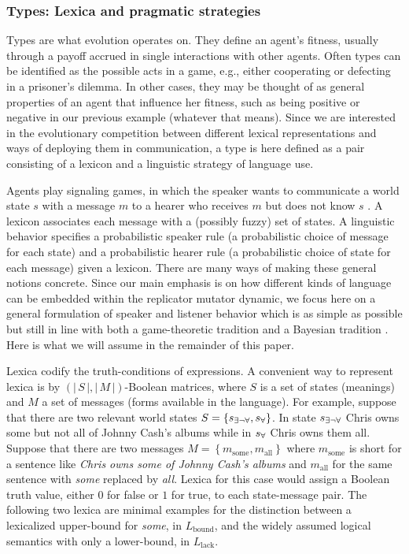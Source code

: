 \documentclass[a4paper, 11pt]{article}
\theoremstyle{Satz}
\newcommand{\set}[1]{\left\{#1\right\}}
\newcommand{\card}[1]{\left \lvert \, #1 \, \right\rvert}
\newcommand{\States}{\ensuremath{S}\xspace}		%
\newcommand{\state}{\ensuremath{s}\xspace}		%
\newcommand{\mystate}[1]{\ensuremath{\state_{\text{#1}}}\xspace} %
\newcommand{\mylang}[1]{\ensuremath{L_{\text{#1}}}\xspace} %
\newcommand{\Messgs}{\ensuremath{M}\xspace}		%
\newcommand{\messg}{\ensuremath{m}\xspace}		%
\newcommand{\mymessg}[1]{\ensuremath{\messg_{\text{#1}}}\xspace} %
\newcommand{\ssome}{\mystate{\ensuremath{\exists\neg\forall}}}
\newcommand{\sall}{\mystate{\ensuremath{\forall}}}
\newcommand{\msome}{\mymessg{some}}
\newcommand{\mall}{\mymessg{all}}
\newcommand{\Lbound}{\mylang{bound}}
\newcommand{\Llack}{\mylang{lack}}
\begin{document}
\subsubsection{Types: Lexica and pragmatic strategies}
\label{sec:languages+use}
Types are what evolution operates on. They define an agent's fitness, usually through a payoff
accrued in single interactions with other agents. Often types can be identified as the possible
acts in a game, e.g., either cooperating or defecting in a prisoner's dilemma. In other cases,
they may be thought of as general properties of an agent that influence her fitness, such as
being positive or negative in our previous example (whatever that means). Since we are
interested in the evolutionary competition between different lexical representations and ways
of deploying them in communication, a type is here defined as a pair consisting of a lexicon
and a linguistic strategy of language use.

Agents play signaling games, in which the speaker wants to communicate a world state $s$ with a
message $m$ to a hearer who receives $m$ but does not know $s$
\citep[e.g.][]{lewis:1969,Skyrms2010:Signals}. A lexicon associates each message with a
(possibly fuzzy) set of states. A linguistic behavior specifies a probabilistic speaker rule (a
probabilistic choice of message for each state) and a probabilistic hearer rule (a
probabilistic choice of state for each message) given a lexicon. There are many ways of making
these general notions concrete. Since our main emphasis is on how different kinds of language
can be embedded within the replicator mutator dynamic, we focus here on a general formulation
of speaker and listener behavior which is as simple as possible but still in line with both a
game-theoretic tradition
\citep[e.g.,][]{benz:2006,benz+vRooij:2007,jaeger:2007b,franke+jaeger:2014} and a Bayesian
tradition
\citep[e.g.,][]{frank+goodman:2012,goodman+stuhlmueller:2013,GoodmanFrank2016:Pragmatic-Langu}. Here
is what we will assume in the remainder of this paper.

Lexica codify the truth-conditions of expressions. A convenient way to represent lexica is by
$(\card{\States}, \card{\Messgs})$-Boolean matrices, where $\States$ is a set of states
(meanings) and $M$ a set of messages (forms available in the language). For example, suppose
that there are two relevant world states $\States = \set{\ssome, \sall}$. In state $\ssome$
Chris owns some but not all of Johnny Cash's albums while in $\sall$ Chris owns them
all. Suppose that there are two messages $\Messgs = \set{\msome, \mall}$ where $\msome$ is
short for a sentence like \emph{Chris owns some of Johnny Cash's albums} and $\mall$ for the
same sentence with \emph{some} replaced by \emph{all}.  Lexica for this case would assign a
Boolean truth value, either $0$ for false or $1$ for true, to each state-message pair. The
following two lexica are minimal examples for the distinction between a lexicalized upper-bound
for \emph{some}, in $\Lbound$, and the widely assumed logical semantics with only a lower-bound,
in $\Llack$.
\end{document}
